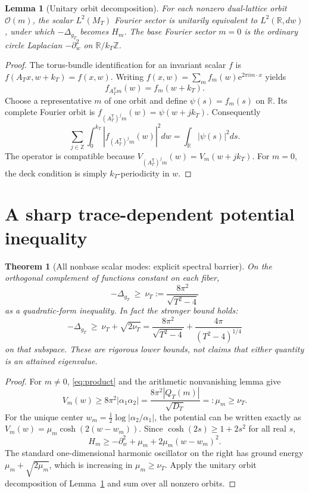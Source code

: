 \documentclass[11pt,a4paper]{article}
\newtheorem{theorem}{Theorem}
\newtheorem{lemma}{Lemma}
\newcommand{\Z}{\mathbb Z}
\newcommand{\R}{\mathbb R}
\newcommand{\Dlt}{\Delta}
\newcommand{\e}{\mathrm e}
\begin{document}
\begin{lemma}[Unitary orbit decomposition]\label{lem:orbit}
For each nonzero dual-lattice orbit $\mathcal O(m)$, the scalar
$L^2(M_T)$ Fourier sector is unitarily equivalent to $L^2(\R,dw)$,
under which $-\Delta_{g_T}$ becomes $H_m$. The base Fourier
sector $m=0$ is the ordinary circle Laplacian
$-\partial_w^2$ on $\R/k_T\Z$.
\end{lemma}
\begin{proof}
The torus-bundle identification for an invariant scalar
$f$ is $f(A_Tx,w+k_T)=f(x,w)$. Writing
$f(x,w)=\sum_m f_m(w)\e^{2\pi im\cdot x}$ yields
\[
f_{A_T^{\mathsf T}m}(w)=f_m(w+k_T).
\]
Choose a representative $m$ of one orbit and define
$\psi(s)=f_m(s)$ on $\R$. Its complete Fourier orbit
is $f_{(A_T^{\mathsf T})^jm}(w)=\psi(w+jk_T)$.
Consequently
\[
\sum_{j\in\Z}\int_0^{k_T}
|f_{(A_T^{\mathsf T})^jm}(w)|^2dw
=\int_{\R}|\psi(s)|^2ds.
\]
The operator is compatible because
$V_{(A_T^{\mathsf T})^jm}(w)=V_m(w+jk_T)$.
For $m=0$, the deck condition is simply
$k_T$-periodicity in $w$.
\end{proof}

\section{A sharp trace-dependent potential inequality}
\begin{theorem}[All nonbase scalar modes: explicit spectral barrier]
\label{thm:barrier}
On the orthogonal complement of functions constant on each fiber,
\begin{equation}\label{eq:gapweak}
-\Dlt_{g_T}\ \ge\
\nu_T:=\frac{8\pi^2}{\sqrt{T^2-4}}
\end{equation}
as a quadratic-form inequality. In fact the stronger bound holds:
\begin{equation}\label{eq:gapstrong}
-\Dlt_{g_T}\ \ge\
\nu_T+\sqrt{2\nu_T}
=\frac{8\pi^2}{\sqrt{T^2-4}}
+\frac{4\pi}{(T^2-4)^{1/4}}
\end{equation}
on that subspace. These are rigorous lower bounds, not
claims that either quantity is an attained eigenvalue.
\end{theorem}
\begin{proof}
For $m\ne0$, \eqref{eq:product} and the arithmetic
nonvanishing lemma give
\[
V_m(w)\ge 8\pi^2|\alpha_1\alpha_2|
=\frac{8\pi^2|Q_T(m)|}{\sqrt{D_T}}
=:\mu_m\ge\nu_T.
\]
For the unique center $w_m=\tfrac12\log|\alpha_2/\alpha_1|$,
the potential can be written exactly as
$V_m(w)=\mu_m\cosh(2(w-w_m))$.
Since $\cosh(2s)\ge1+2s^2$ for all real $s$,
\[
H_m\ge-\partial_w^2+
\mu_m+2\mu_m(w-w_m)^2.
\]
The standard one-dimensional harmonic oscillator on the right
has ground energy $\mu_m+\sqrt{2\mu_m}$, which is increasing
in $\mu_m\ge\nu_T$.
Apply the unitary orbit decomposition
of Lemma~\ref{lem:orbit} and sum over all nonzero orbits.
\end{proof}
\end{document}

